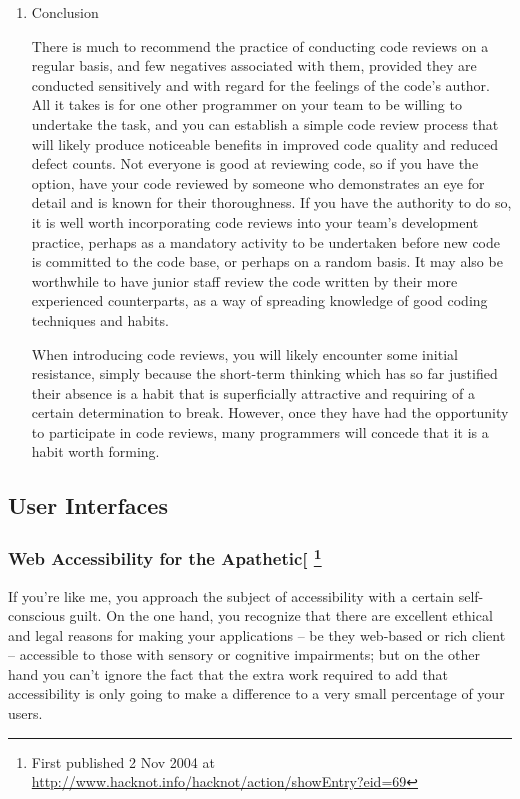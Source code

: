 \documentclass{article}
\begin{document}
\begin{enumerate}
\item Conclusion
\label{sec:orgheadline276}

There is much to recommend the practice of conducting code reviews on a
regular basis, and few negatives associated with them, provided they are
conducted sensitively and with regard for the feelings of the code's
author. All it takes is for one other programmer on your team to be
willing to undertake the task, and you can establish a simple code
review process that will likely produce noticeable benefits in improved
code quality and reduced defect counts. Not everyone is good at
reviewing code, so if you have the option, have your code reviewed by
someone who demonstrates an eye for detail and is known for their
thoroughness. If you have the authority to do so, it is well worth
incorporating code reviews into your team's development practice,
perhaps as a mandatory activity to be undertaken before new code is
committed to the code base, or perhaps on a random basis. It may also be
worthwhile to have junior staff review the code written by their more
experienced counterparts, as a way of spreading knowledge of good coding
techniques and habits.

When introducing code reviews, you will likely encounter some initial
resistance, simply because the short-term thinking which has so far
justified their absence is a habit that is superficially attractive and
requiring of a certain determination to break. However, once they have
had the opportunity to participate in code reviews, many programmers
will concede that it is a habit worth forming.
\end{enumerate}

\subsection{User Interfaces}
\label{sec:orgheadline301}

\subsubsection{Web Accessibility for the Apathetic[ \footnote{First published 2 Nov 2004 at
\url{http://www.hacknot.info/hacknot/action/showEntry?eid=69}}}
\label{sec:orgheadline287}

If you're like me, you approach the subject of accessibility with a
certain self-conscious guilt. On the one hand, you recognize that there
are excellent ethical and legal reasons for making your applications --
be they web-based or rich client -- accessible to those with sensory or
cognitive impairments; but on the other hand you can't ignore the fact
that the extra work required to add that accessibility is only going to
make a difference to a very small percentage of your users.
\end{document}
